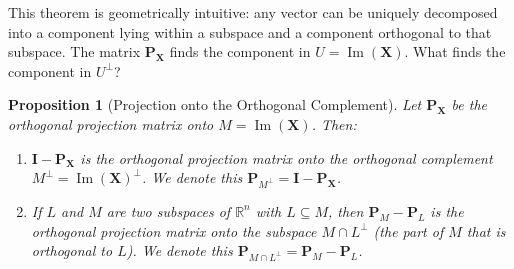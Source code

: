 \documentclass[11pt, a4paper]{article}
\DeclareMathOperator{\Image}{\mathrm{Im}}        %
\newtheorem{proposition}[theorem]{Proposition}
\theoremstyle{definition}
\theoremstyle{remark}
\newcommand{\RR}{\mathbb{R}}             %
\newcommand{\mat}[1]{\mathbf{#1}}       %
\begin{document}
This theorem is geometrically intuitive: any vector can be uniquely decomposed into a component lying within a subspace and a component orthogonal to that subspace. The matrix $\mat{P}_{\mat{X}}$ finds the component in $U = \Image(\mat{X})$. What finds the component in $U^{\perp}$?

\begin{proposition}[Projection onto the Orthogonal Complement]
\label{prop:complement_projection}
Let $\mat{P}_{\mat{X}}$ be the orthogonal projection matrix onto $M = \Image(\mat{X})$. Then:
\begin{enumerate}
    \item $\mat{I} - \mat{P}_{\mat{X}}$ is the orthogonal projection matrix onto the orthogonal complement $M^{\perp} = \Image(\mat{X})^{\perp}$. We denote this $\mat{P}_{M^{\perp}} = \mat{I} - \mat{P}_{\mat{X}}$.
    \item If $L$ and $M$ are two subspaces of $\RR^n$ with $L \subseteq M$, then $\mat{P}_{M} - \mat{P}_{L}$ is the orthogonal projection matrix onto the subspace $M \cap L^{\perp}$ (the part of $M$ that is orthogonal to $L$). We denote this $\mat{P}_{M \cap L^{\perp}} = \mat{P}_M - \mat{P}_L$.
\end{enumerate}
\end{proposition}
\end{document}

